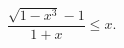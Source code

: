 \begin{ex}[type=inequality]
	\begin{condition}
		$ \dfrac{\sqrt{1 - x^3}-1}{1+ x}\leqslant x.$
	\end{condition}
\end{ex}